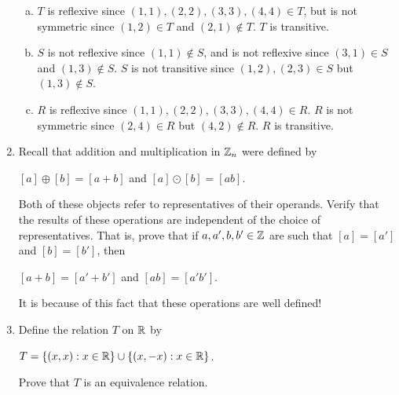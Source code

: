\documentclass[11pt,fleqn,dvipsnames,usenames]{article}
\newcommand{\p}{\noindent}
\begin{document}
\begin{enumerate}
\solution
\begin{enumerate}[(a)]
\item $T$ is reflexive since $(1,1), (2,2), (3,3), (4,4)\in T$, but is not symmetric since $(1,2)\in T$ and $(2,1)\notin T$.  $T$ is transitive.
\item $S$ is not reflexive since $(1,1)\notin S$, and is not reflexive since $(3,1)\in S$ and $(1,3)\notin S$.  $S$ is not transitive since $(1,2),(2,3)\in S$ but $(1,3)\notin S$.
\item $R$ is reflexive since $(1,1), (2,2), (3,3), (4,4)\in R$.  $R$ is not symmetric since $(2,4)\in R$ but $(4,2)\notin R$.  $R$ is transitive.
\end{enumerate}

\item Recall that addition and multiplication in $\mathbb{Z}_n$ were defined by
\begin{center}
$[a] \oplus [b] = [a + b]$ and $[a]\odot [b] = [ab]$.
\end{center}
\p Both of these objects refer to representatives of their operands.  Verify that the results of these operations are independent of the choice of representatives.  That is, prove that if $a,a',b,b'\in\mathbb{Z}$ are such that $[a] = [a']$ and $[b] = [b']$, then
\begin{center}
$[a + b] = [a' + b']$ and $[ab] = [a'b']$.
\end{center}

\note It is because of this fact that these operations are well defined!


\item Define the relation $T$ on $\mathbb{R}$ by
\begin{center}
$T = \left\{(x,x): x\in\mathbb{R}\right\}\cup \left\{(x,-x): x\in\mathbb{R}\right\}$.
\end{center}
Prove that $T$ is an equivalence relation.


\end{enumerate}
\end{document}
